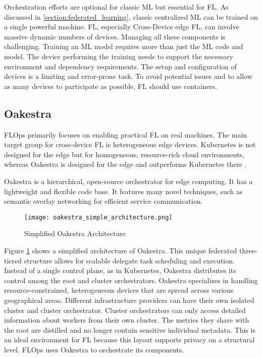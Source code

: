 Orchestration efforts are optional for classic ML but essential for FL.
As discussed in \ref{section:federated_learning}, classic centralized ML can be trained on a single powerful machine.
FL, especially Cross-Device edge FL, can involve massive dynamic numbers of devices.
Managing all these components is challenging.
Training an ML model requires more than just the ML code and model.
The device performing the training needs to support the necessary environment and dependency requirements.
The setup and configuration of devices is a limiting and error-prone task.
To avoid potential issues and to allow as many devices to participate as possible, FL should use containers. 


\subsection{Oakestra}

FLOps primarily focuses on enabling practical FL on real machines.
The main target group for cross-device FL is heterogeneous edge devices.
Kubernetes is not designed for the edge but for homogeneous, resource-rich cloud environments, whereas Oakestra is designed for the edge and outperforms Kubernetes there \cite{paper:oakestra_usenix}.

Oakestra is a hierarchical, open-source orchestrator for edge computing.
It has a lightweight and flexible code base.
It features many novel techniques, such as semantic overlay networking for efficient service communication.

\begin{figure}[!ht]
    \begin{adjustwidth}{-0.1\paperwidth}{-0.1\paperwidth}
        \centering
        \texttt{[image: oakestra\_simple\_architecture.png]}
        \caption{Simplified Oakestra Architecture}
        \label{fig:simple_oakestra_architecture}
    \end{adjustwidth}
\end{figure}

Figure \ref{fig:simple_oakestra_architecture} shows a simplified architecture of Oakestra.
This unique federated three-tiered structure allows for scalable delegate task scheduling and execution.
Instead of a single control plane, as in Kubernetes, Oakestra distributes its control among the root and cluster orchestrators.
Oakestra specializes in handling resource-constrained, heterogeneous devices that are spread across various geographical areas.
Different infrastructure providers can have their own isolated cluster and cluster orchestrator.
Cluster orchestrators can only access detailed information about workers from their own cluster.
The metrics they share with the root are distilled and no longer contain sensitive individual metadata.
This is an ideal environment for FL because this layout supports privacy on a structural level.
FLOps uses Oakestra to orchestrate its components.

